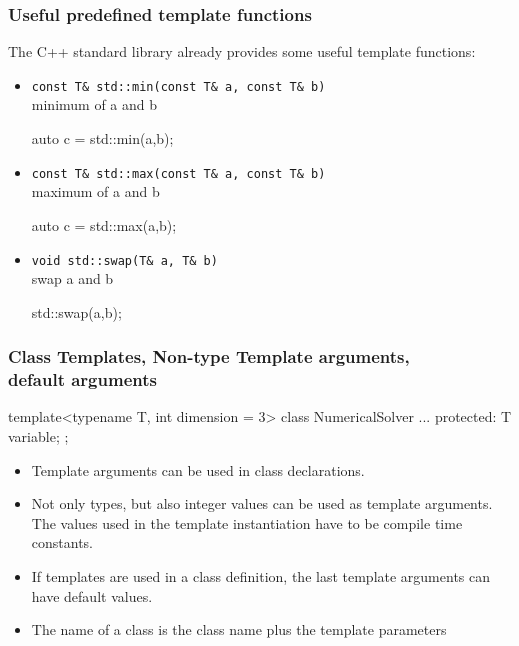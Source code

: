 \documentclass[aspectratio=169,ignorenonframetext,11pt]{beamer}
\def\inline{\lstinline[basicstyle=\small\ttfamily]}
\begin{document}

\begin{frame}[fragile]
\frametitle{Useful predefined template functions}
The C++ standard library already provides some useful template functions:
\begin{itemize}%
\item \inline!const T& std::min(const T& a, const T& b)! \\
  minimum of a and b\\
  \begin{cppcode}
    auto c = std::min(a,b);
  \end{cppcode}
\item \inline!const T& std::max(const T& a, const T& b)! \\
  maximum of a and b\\
  \begin{cppcode}
    auto c = std::max(a,b);
  \end{cppcode}
\item \inline!void std::swap(T& a, T& b)! \\
  swap a and b\\
  \begin{cppcode}
    std::swap(a,b);
  \end{cppcode}
\end{itemize}
\end{frame}



\begin{frame}[fragile]
\frametitle{Class Templates, Non-type Template arguments, \\ default arguments}
\begin{cppcode}
template<typename T, int dimension = 3>
class NumericalSolver {
    ...
  protected:
    T variable;
};
\end{cppcode}
\begin{itemize}%
\item Template arguments can be used in class declarations.
\item Not only types, but also integer values can be used as template arguments. The values used in the template instantiation have to be compile time constants.
\item If templates are used in a class definition, the last template arguments can have default values.
\item The name of a class is the class name plus the template parameters
\end{itemize}

\end{frame}
\end{document}
